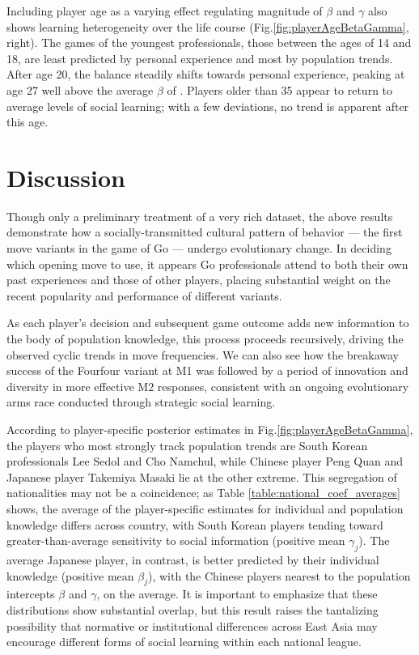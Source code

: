 \documentclass[reqno,12pt]{amsart}
\begin{document}
Including player age as a varying effect regulating magnitude of $\beta$ and $\gamma$ also shows learning heterogeneity over the life course (Fig.\;\ref{fig:playerAgeBetaGamma}, right). The games of the youngest professionals, those between the ages of 14 and 18, are least predicted by personal experience and most by population trends. After age 20, the balance steadily shifts towards personal experience, peaking at age 27 well above the average $\beta$ of \betaIndUse. Players older than 35 appear to return to average levels of social learning; with a few deviations, no trend is apparent after this age.

\section{Discussion}

Though only a preliminary treatment of a very rich dataset, the above results demonstrate how a socially-transmitted cultural pattern of behavior --- the first move variants in the game of Go --- undergo evolutionary change. In deciding which opening move to use, it appears Go professionals attend to both their own past experiences and those of other players, placing substantial weight on the recent popularity and performance of different variants.

As each player's decision and subsequent game outcome adds new information to the body of population knowledge, this process proceeds recursively, driving the observed cyclic trends in move frequencies. We can also see how the breakaway success of the Fourfour variant at M1 was followed by a period of innovation and diversity in more effective M2 responses, consistent with an ongoing evolutionary arms race conducted through strategic social learning.

According to player-specific posterior estimates in Fig.\;\ref{fig:playerAgeBetaGamma}, the players who most strongly track population trends are South Korean professionals Lee Sedol and Cho Namchul, while Chinese player Peng Quan and Japanese player Takemiya Masaki lie at the other extreme. This segregation of nationalities may not be a coincidence; as Table \ref{table:national_coef_averages} shows, the average of the player-specific estimates for individual and population knowledge differs across country, with South Korean players tending toward greater-than-average sensitivity to social information (positive mean $\gamma_j$). The average Japanese player, in contrast, is better predicted by their individual knowledge (positive mean $\beta_j$), with the \nChinesePlayers{} Chinese players nearest to the population intercepts $\beta$ and $\gamma$, on the average. It is important to emphasize that these distributions show substantial overlap, but this result raises the tantalizing possibility that normative or institutional differences across East Asia may encourage different forms of social learning within each national league.
\end{document}
